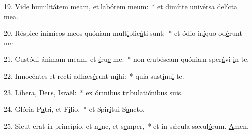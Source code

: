19. Vide humilitátem meam, et lab\uline{ó}rem m\uline{e}um:~* et dimítte univérsa del\uline{í}cta m\uline{e}a.\par 
20. Réspice inimícos meos quóniam mult\uline{i}plic\uline{á}ti sunt:~* et ódio in\uline{í}quo od\uline{é}runt me.\par 
21. Custódi ánimam meam, et \uline{é}ru\uline{e} me:~* non erubéscam quóniam sper\uline{á}vi \uline{i}n te.\par 
22. Innocéntes et recti adhæs\uline{é}runt m\uline{i}hi:~* quia sust\uline{í}nu\uline{i} te.\par 
23. Líbera, D\uline{e}us, \uline{I}sraël:~* ex ómnibus tribulati\uline{ó}nibus s\uline{u}is.\par 
24. Glória P\uline{a}tri, et F\uline{í}lio,~* et Spir\uline{í}tui S\uline{a}ncto.\par 
25. Sicut erat in princípio, et n\uline{u}nc, et s\uline{e}mper,~* et in sǽcula sæcul\uline{ó}rum. \uline{A}men.\par 
